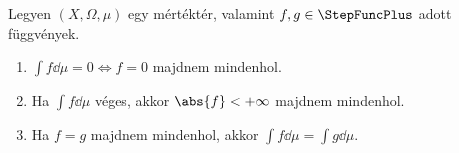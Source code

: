 \documentclass[
]{elteikthesis}[2024/04/26]
\begin{document}
	
	\newpage
	\begin{theorem}{}{}
		 Legyen \( (X, \Omega, \mu) \) egy mértéktér, 
		 valamint \( f, g \in \StepFuncPlus \) adott függvények.
		 \begin{enumerate}[label=\arabic*.]
		 	\item\label{eq:majdnem-mindenhol-01}
		 	\( \displaystyle \int f \dd{\mu} = 0 \iff f = 0 \) majdnem mindenhol.
		 	
		 	\item\label{eq:majdnem-mindenhol-02}
		 	Ha \( \displaystyle \int f \dd{\mu}  \) véges, 
		 	akkor \( \abs{f} < +\infty \) majdnem mindenhol.
		 	
		 	\item\label{eq:majdnem-mindenhol-03}
		 	Ha \( f = g \) majdnem mindenhol, 
		 	akkor \( \displaystyle \int f \dd{\mu} = \int g \dd{\mu} \).
		 \end{enumerate}
	\end{theorem}
\end{document}
